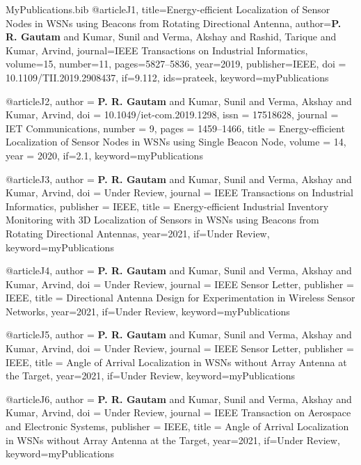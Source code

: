 
\begin{filecontents}{MyPublications.bib}
@article{J1,
  title={Energy-efficient Localization of Sensor Nodes in {WSNs} using Beacons from Rotating Directional Antenna},
  author={\textbf{P. R. {Gautam}} and Kumar, Sunil and Verma, Akshay and Rashid, Tarique and Kumar, Arvind},
  journal={IEEE Transactions on Industrial Informatics},
  volume={15},
  number={11},
  pages={5827--5836},
  year={2019},
  publisher={IEEE},
  doi = {10.1109/TII.2019.2908437},
  if={9.112},
  ids={prateek},
  keyword={myPublications}
}

@article{J2,
  author = {\textbf{P. R. {Gautam}} and Kumar, Sunil and Verma, Akshay and Kumar, Arvind},
  doi = {10.1049/iet-com.2019.1298},
  issn = {17518628},
  journal = {IET Communications},
  number = {9},
  pages = {1459--1466},
  title = {Energy-efficient Localization of Sensor Nodes in {WSNs} using Single Beacon Node},
  volume = {14},
  year = {2020},
  if={2.1},
  keyword={myPublications}
}


@article{J3,
  author = {\textbf{P. R. {Gautam}} and Kumar, Sunil and Verma, Akshay and Kumar, Arvind},
  doi = {Under Review},
  journal = {IEEE Transactions on Industrial Informatics},
  publisher = {IEEE},
  title = {Energy-efficient Industrial Inventory Monitoring with {3D} Localization of Sensors in {WSNs} using Beacons from Rotating Directional Antennas},
  year={2021},
  if={Under Review},
  keyword={myPublications}
}

@article{J4,
  author = {\textbf{P. R. {Gautam}} and Kumar, Sunil and Verma, Akshay and Kumar, Arvind},
  doi = {Under Review},
  journal = {IEEE Sensor Letter},
  publisher = {IEEE},
  title = {Directional Antenna Design for Experimentation in Wireless Sensor Networks},
  year={2021},
  if={Under Review},
  keyword={myPublications}
}

@article{J5,
  author = {\textbf{P. R. {Gautam}} and Kumar, Sunil and Verma, Akshay and Kumar, Arvind},
  doi = {Under Review},
  journal = {IEEE Sensor Letter},
  publisher = {IEEE},
  title = {Angle of Arrival Localization in WSNs without Array Antenna at the Target},
  year={2021},
  if={Under Review},
  keyword={myPublications}
}


@article{J6,
  author = {\textbf{P. R. {Gautam}} and Kumar, Sunil and Verma, Akshay and Kumar, Arvind},
  doi = {Under Review},
  journal = {IEEE Transaction on Aerospace and Electronic Systems},
  publisher = {IEEE},
  title = {Angle of Arrival Localization in WSNs without Array Antenna at the Target},
  year={2021},
  if={Under Review},
  keyword={myPublications}
}



\end{filecontents}
